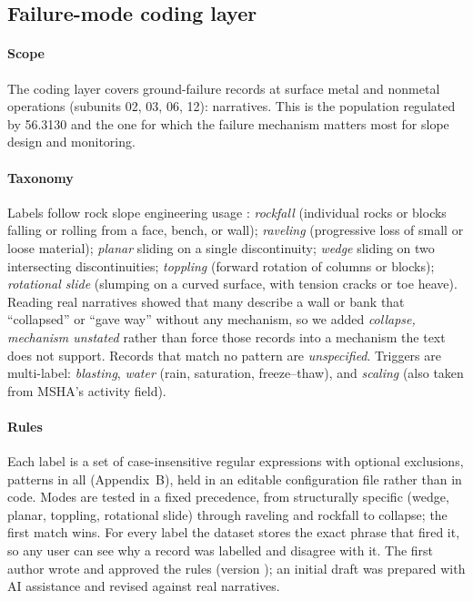 \documentclass[letterpaper,twocolumn,10pt]{article}
\begin{document}
\subsection{Failure-mode coding layer}
\paragraph{Scope} The coding layer covers ground-failure records at surface metal and nonmetal operations (subunits 02, 03, 06, 12): \NCoded{} narratives. This is the population regulated by 56.3130 and the one for which the failure mechanism matters most for slope design and monitoring.

\paragraph{Taxonomy} Labels follow rock slope engineering usage \citep{WyllieMah2004,ReadStacey2009,GoodmanBray1976,Hungr2014}: \emph{rockfall} (individual rocks or blocks falling or rolling from a face, bench, or wall); \emph{raveling} (progressive loss of small or loose material); \emph{planar} sliding on a single discontinuity; \emph{wedge} sliding on two intersecting discontinuities; \emph{toppling} (forward rotation of columns or blocks); \emph{rotational slide} (slumping on a curved surface, with tension cracks or toe heave). Reading real narratives showed that many describe a wall or bank that ``collapsed'' or ``gave way'' without any mechanism, so we added \emph{collapse, mechanism unstated} rather than force those records into a mechanism the text does not support. Records that match no pattern are \emph{unspecified}. Triggers are multi-label: \emph{blasting}, \emph{water} (rain, saturation, freeze--thaw), and \emph{scaling} (also taken from MSHA's activity field).

\paragraph{Rules} Each label is a set of case-insensitive regular expressions with optional exclusions, \NPatterns{} patterns in all (Appendix~B), held in an editable configuration file rather than in code. Modes are tested in a fixed precedence, from structurally specific (wedge, planar, toppling, rotational slide) through raveling and rockfall to collapse; the first match wins. For every label the dataset stores the exact phrase that fired it, so any user can see why a record was labelled and disagree with it. The first author wrote and approved the rules (version \RulesVersion); an initial draft was prepared with AI assistance and revised against real narratives.
\end{document}
